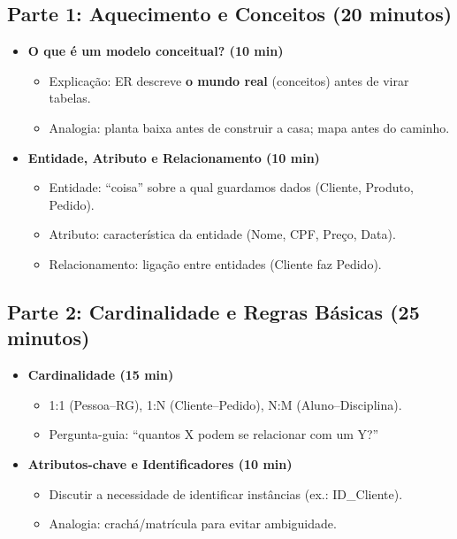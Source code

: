 \documentclass[12pt,a4paper]{article}
\begin{document}
\subsection*{Parte 1: Aquecimento e Conceitos (20 minutos)}
\begin{itemize}[leftmargin=*,itemsep=0.35em]
  \item \textbf{O que é um modelo conceitual? (10 min)}
  \begin{itemize}[leftmargin=*,itemsep=0.25em]
    \item Explicação: ER descreve \textbf{o mundo real} (conceitos) antes de virar tabelas.
    \item Analogia: planta baixa antes de construir a casa; mapa antes do caminho.
  \end{itemize}
  \item \textbf{Entidade, Atributo e Relacionamento (10 min)}
  \begin{itemize}[leftmargin=*,itemsep=0.25em]
    \item Entidade: ``coisa'' sobre a qual guardamos dados (Cliente, Produto, Pedido).
    \item Atributo: característica da entidade (Nome, CPF, Preço, Data).
    \item Relacionamento: ligação entre entidades (Cliente faz Pedido).
  \end{itemize}
\end{itemize}

\subsection*{Parte 2: Cardinalidade e Regras Básicas (25 minutos)}
\begin{itemize}[leftmargin=*,itemsep=0.35em]
  \item \textbf{Cardinalidade (15 min)}
  \begin{itemize}[leftmargin=*,itemsep=0.25em]
    \item 1:1 (Pessoa--RG), 1:N (Cliente--Pedido), N:M (Aluno--Disciplina).
    \item Pergunta-guia: ``quantos X podem se relacionar com um Y?''
  \end{itemize}
  \item \textbf{Atributos-chave e Identificadores (10 min)}
  \begin{itemize}[leftmargin=*,itemsep=0.25em]
    \item Discutir a necessidade de identificar instâncias (ex.: ID\_Cliente).
    \item Analogia: crachá/matrícula para evitar ambiguidade.
  \end{itemize}
\end{itemize}
\end{document}
